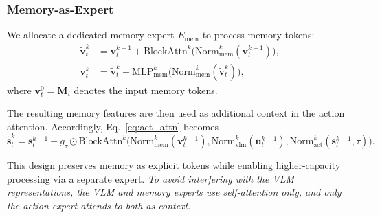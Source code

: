 \subsubsection{Memory-as-Expert}

We allocate a dedicated memory expert $E_{\text{mem}}$ to process memory tokens:
\begin{align}
\tilde{\mathbf{v}}_t^{k}
&=
\mathbf{v}_t^{k-1}
+
\mathrm{BlockAttn}^{k}\!\big(
\mathrm{Norm}^{k}_{\text{mem}}(\mathbf{v}_t^{k-1})
\big), \\
\mathbf{v}_t^{k}
&=
\tilde{\mathbf{v}}_t^{k}
+
\mathrm{MLP}_{\text{mem}}^{k}\!\big(
\mathrm{Norm}^{k}_{\text{mem}}(\tilde{\mathbf{v}}_t^{k})
\big),
\end{align}
where $\mathbf{v}_t^{0}=\mathbf{M}_t$ denotes the input memory tokens.

The resulting memory features are then used as additional context in the action attention.
Accordingly, Eq.~\ref{eq:act_attn} becomes
\[
\tilde{\mathbf{s}}_t^{k}
=
\mathbf{s}_t^{k-1}
+
g_{\tau} \odot
\mathrm{BlockAttn}^{k}\!\big(
\mathrm{Norm}^{k}_{\text{mem}}(\mathbf{v}_t^{k-1}),
\mathrm{Norm}^{k}_{\text{vlm}}(\mathbf{u}_t^{k-1}),
\mathrm{Norm}^{k}_{\text{act}}(\mathbf{s}_t^{k-1}, \tau)
\big).
\]

This design preserves memory as explicit tokens while enabling higher-capacity processing via a separate expert.
\textit{To avoid interfering with the VLM representations, the VLM and memory experts use self-attention only, and only the action expert attends to both as context}.
